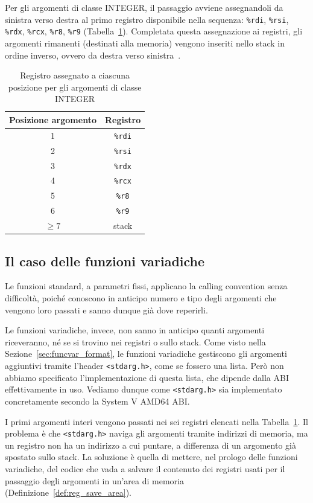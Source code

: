 Per gli argomenti di classe INTEGER, il passaggio avviene assegnandoli da sinistra verso destra al primo registro disponibile nella sequenza: \texttt{\%rdi}, \texttt{\%rsi}, \texttt{\%rdx}, \texttt{\%rcx}, \texttt{\%r8}, \texttt{\%r9} (Tabella~\ref{tab:registri_integer}).
Completata questa assegnazione ai registri, gli argomenti rimanenti (destinati alla memoria) vengono inseriti nello stack in ordine inverso, ovvero da destra verso sinistra~\cite{psabi2025}.

\begin{table}[ht]
    \centering
    \caption{Registro assegnato a ciascuna posizione per gli argomenti di classe INTEGER}
    \label{tab:registri_integer}
    \begin{tabular}{cc}
        \toprule
        Posizione argomento & Registro \\
        \midrule
        1 & \texttt{\%rdi} \\
        2 & \texttt{\%rsi} \\
        3 & \texttt{\%rdx} \\
        4 & \texttt{\%rcx} \\
        5 & \texttt{\%r8}  \\
        6 & \texttt{\%r9}  \\
        \midrule
        $\geq 7$ & stack \\
        \bottomrule
    \end{tabular}
\end{table}

\subsection{Il caso delle funzioni variadiche}\label{subsec:funvar_cc}
Le funzioni standard, a parametri fissi, applicano la calling convention senza difficoltà, poiché conoscono in anticipo numero e tipo degli argomenti che vengono loro passati e sanno dunque già dove reperirli.

Le funzioni variadiche, invece, non sanno in anticipo quanti argomenti riceveranno, né se si trovino nei registri o sullo stack.
Come visto nella Sezione~\ref{sec:funcvar_format}, le funzioni variadiche gestiscono gli argomenti aggiuntivi tramite l'header \texttt{<stdarg.h>}, come se fossero una lista. Però non abbiamo specificato l'implementazione di questa lista, che dipende dalla ABI effettivamente in uso. Vediamo dunque come \texttt{<stdarg.h>} sia implementato concretamente secondo la System V AMD64 ABI.

I primi argomenti interi vengono passati nei sei registri elencati nella Tabella~\ref{tab:registri_integer}. 
Il problema è che \texttt{<stdarg.h>} naviga gli argomenti tramite indirizzi di memoria, ma un registro non ha un indirizzo a cui puntare, a differenza di un argomento già spostato sullo stack.
La soluzione è quella di mettere, nel prologo delle funzioni variadiche, del codice che vada a salvare il contenuto dei registri usati per il passaggio degli argomenti in un'area di memoria (Definizione~\ref{def:reg_save_area}).

